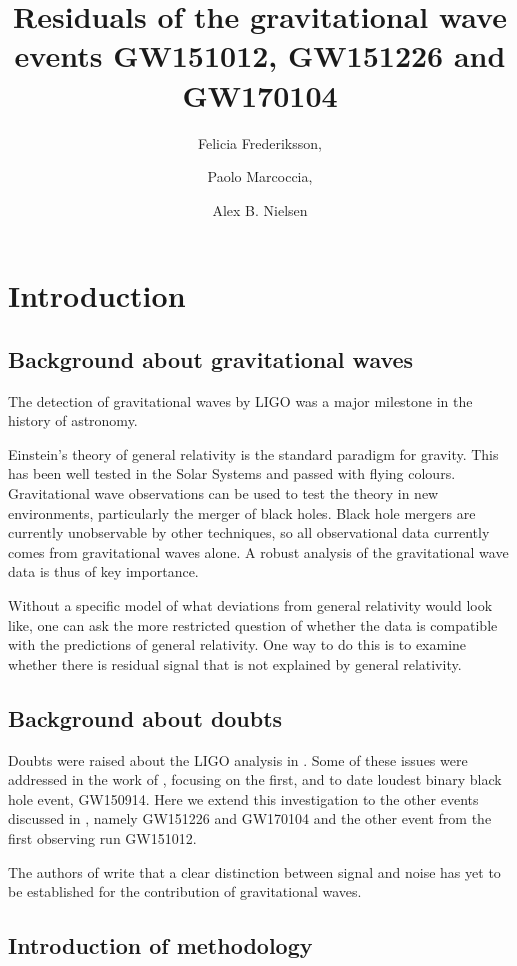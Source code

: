 \documentclass[a4paper,11pt]{article}
\title{Residuals of the gravitational wave events GW151012, GW151226 and GW170104}
\author[a]{Felicia Frederiksson,\note{Corresponding author.}}
\author[b]{Paolo Marcoccia,}
\author[b]{Alex B. Nielsen}
\affiliation[a]{University of Uppsala, Uppsala, Sweden}
\affiliation[b]{University of Stavanger, Stavanger, Norway}
\begin{document}
\maketitle

\section{Introduction}

\subsection{Background about gravitational waves}
The detection of gravitational waves by LIGO was a major milestone in the history of astronomy.

Einstein's theory of general relativity is the standard paradigm for gravity. This has been well tested in the Solar Systems and passed with flying colours. Gravitational wave observations can be used to test the theory in new environments, particularly the merger of black holes. Black hole mergers are currently unobservable by other techniques, so all observational data currently comes from gravitational waves alone. A robust analysis of the gravitational wave data is thus of key importance.

Without a specific model of what deviations from general relativity would look like, one can ask the more restricted question of whether the data is compatible with the predictions of general relativity. One way to do this is to examine whether there is residual signal that is not explained by general relativity.

\subsection{Background about doubts}
Doubts were raised about the LIGO analysis in \cite{Creswell:2017rbh}. Some of these issues were addressed in the work of \cite{Nielsen:2018bhc}, focusing on the first, and to date loudest binary black hole event, GW150914. Here we extend this investigation to the other events discussed in \cite{Creswell:2017rbh}, namely GW151226 and GW170104 and the other event from the first observing run GW151012.

The authors of \cite{Creswell:2017rbh} write that a clear distinction between signal and noise has yet to be established for the contribution of gravitational waves.

\subsection{Introduction of methodology}
\end{document}
